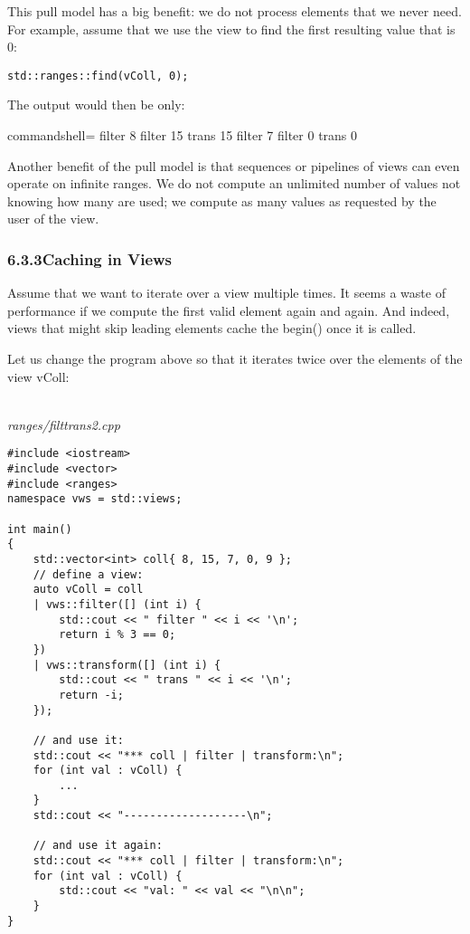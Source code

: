 This pull model has a big benefit: we do not process elements that we never need. For example, assume that we use the view to find the first resulting value that is 0:

\begin{lstlisting}[style=styleCXX]
std::ranges::find(vColl, 0);
\end{lstlisting}

The output would then be only:

{\footnotesize
\begin{tcblisting}{commandshell={}}
filter 8
filter 15
trans 15
filter 7
filter 0
trans 0
\end{tcblisting}
}

Another benefit of the pull model is that sequences or pipelines of views can even operate on infinite ranges. We do not compute an unlimited number of values not knowing how many are used; we compute as many values as requested by the user of the view.

\subsubsection*{ 6.3.3\hspace{0.2cm}Caching in Views}

Assume that we want to iterate over a view multiple times. It seems a waste of performance if we compute the first valid element again and again. And indeed, views that might skip leading elements cache the begin() once it is called.

Let us change the program above so that it iterates twice over the elements of the view vColl:

\noindent
\hspace*{\fill} \\ %
\textit{ranges/filttrans2.cpp}

\begin{lstlisting}[style=styleCXX]
#include <iostream>
#include <vector>
#include <ranges>
namespace vws = std::views;

int main()
{
	std::vector<int> coll{ 8, 15, 7, 0, 9 };
	// define a view:
	auto vColl = coll
	| vws::filter([] (int i) {
		std::cout << " filter " << i << '\n';
		return i % 3 == 0;
	})
	| vws::transform([] (int i) {
		std::cout << " trans " << i << '\n';
		return -i;
	});
	
	// and use it:
	std::cout << "*** coll | filter | transform:\n";
	for (int val : vColl) {
		...
	}
	std::cout << "-------------------\n";
	
	// and use it again:
	std::cout << "*** coll | filter | transform:\n";
	for (int val : vColl) {
		std::cout << "val: " << val << "\n\n";
	}
}
\end{lstlisting}

